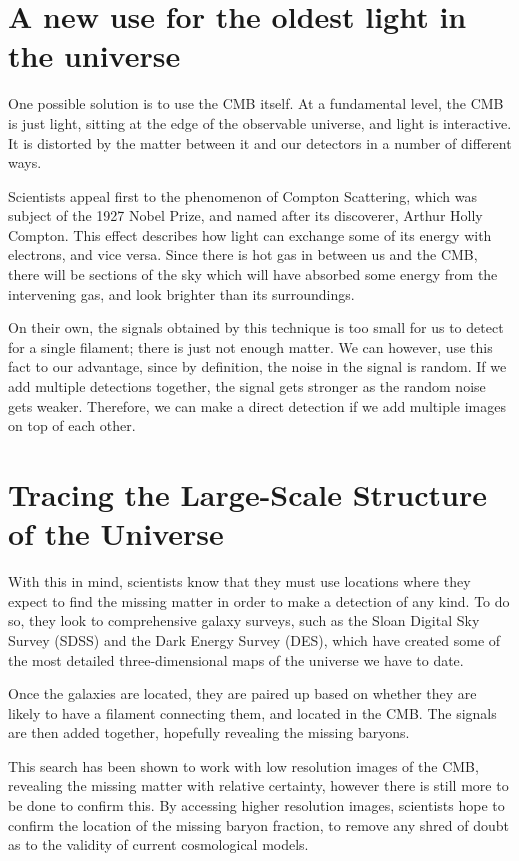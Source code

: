 \documentclass{nature}
\begin{document}
\section{A new use for the oldest light in the universe}

One possible solution is to use the CMB itself. At a fundamental level, the CMB is just light, sitting at the edge of the observable universe, and light is interactive. It is distorted by the matter between it and our detectors in a number of different ways.

Scientists appeal first to the phenomenon of Compton Scattering, which was subject of the 1927 Nobel Prize, and named after its discoverer, Arthur Holly Compton. This effect describes how light can exchange some of its energy with electrons, and vice versa. Since there is hot gas in between us and the CMB, there will be sections of the sky which will have absorbed some energy from the intervening gas, and look brighter than its surroundings. 

On their own, the signals obtained by this technique is too small for us to detect for a single filament; there is just not enough matter. We can however, use this fact to our advantage, since by definition, the noise in the signal is random. If we add multiple detections together, the signal gets stronger as the random noise gets weaker. Therefore, we can make a direct detection if we add multiple images on top of each other.

\section{Tracing the Large-Scale Structure of the Universe}

With this in mind, scientists know that they must use locations where they expect to find the missing matter in order to make a detection of any kind. To do so, they look to comprehensive galaxy surveys, such as the Sloan Digital Sky Survey (SDSS) and the Dark Energy Survey (DES), which have created some of the most detailed three-dimensional maps of the universe we have to date.

Once the galaxies are located, they are paired up based on whether they are likely to have a filament connecting them, and located in the CMB. The signals are then added together, hopefully revealing the missing baryons.

This search has been shown to work with low resolution images of the CMB, revealing the missing matter with relative certainty, however there is still more to be done to confirm this. By accessing higher resolution images, scientists hope to confirm the location of the missing baryon fraction, to remove any shred of doubt as to the validity of current cosmological models.



\end{document}
